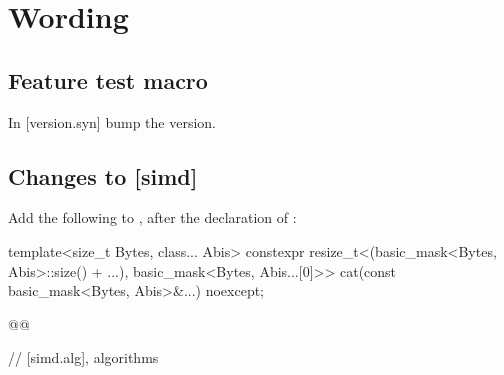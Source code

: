 \section{Wording}\label{sec:wording}
\subsection{Feature test macro}

In [version.syn] bump the  version.

\subsection{Changes to {[simd]}}
\def\rSec#1[#2]#3{%
  \ifcase#1\wgSubsection[subsection]{#3}{#2}
  \or\wgSubsubsection[subsubsection]{#3}{#2}
  \or\wgSubsubsubsection[paragraph]{#3}{#2}
  \or\error
\fi}

Add the following to , after the declaration of :
\begin{wgText}
\begin{codeblock}
  template<size_t Bytes, class... Abis>
    constexpr resize_t<(basic_mask<Bytes, Abis>::size() + ...),
      basic_mask<Bytes, Abis...[0]>> cat(const basic_mask<Bytes, Abis>&...) noexcept;

  @@

  // [simd.alg], algorithms
\end{codeblock}
\end{wgText}

